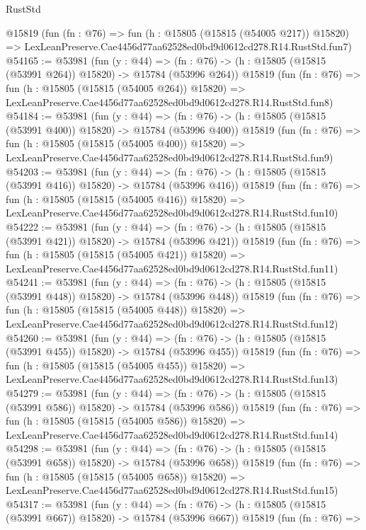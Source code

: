 \begin{lexlean}{RustStd}
\begin{coremodule}
    @15819
    (fun (fn : @76) =>
    fun (h : @15805 (@15815 (@54005 @217)) @15820) =>
    LexLeanPreserve.Cae4456d77aa62528ed0bd9d0612cd278.R14.RustStd.fun7)
@54165 := @53981
    (fun (y : @44) =>
    (fn : @76) -> (h : @15805 (@15815 (@53991 @264)) @15820) -> @15784 (@53996 @264))
    @15819
    (fun (fn : @76) =>
    fun (h : @15805 (@15815 (@54005 @264)) @15820) =>
    LexLeanPreserve.Cae4456d77aa62528ed0bd9d0612cd278.R14.RustStd.fun8)
@54184 := @53981
    (fun (y : @44) =>
    (fn : @76) -> (h : @15805 (@15815 (@53991 @400)) @15820) -> @15784 (@53996 @400))
    @15819
    (fun (fn : @76) =>
    fun (h : @15805 (@15815 (@54005 @400)) @15820) =>
    LexLeanPreserve.Cae4456d77aa62528ed0bd9d0612cd278.R14.RustStd.fun9)
@54203 := @53981
    (fun (y : @44) =>
    (fn : @76) -> (h : @15805 (@15815 (@53991 @416)) @15820) -> @15784 (@53996 @416))
    @15819
    (fun (fn : @76) =>
    fun (h : @15805 (@15815 (@54005 @416)) @15820) =>
    LexLeanPreserve.Cae4456d77aa62528ed0bd9d0612cd278.R14.RustStd.fun10)
@54222 := @53981
    (fun (y : @44) =>
    (fn : @76) -> (h : @15805 (@15815 (@53991 @421)) @15820) -> @15784 (@53996 @421))
    @15819
    (fun (fn : @76) =>
    fun (h : @15805 (@15815 (@54005 @421)) @15820) =>
    LexLeanPreserve.Cae4456d77aa62528ed0bd9d0612cd278.R14.RustStd.fun11)
@54241 := @53981
    (fun (y : @44) =>
    (fn : @76) -> (h : @15805 (@15815 (@53991 @448)) @15820) -> @15784 (@53996 @448))
    @15819
    (fun (fn : @76) =>
    fun (h : @15805 (@15815 (@54005 @448)) @15820) =>
    LexLeanPreserve.Cae4456d77aa62528ed0bd9d0612cd278.R14.RustStd.fun12)
@54260 := @53981
    (fun (y : @44) =>
    (fn : @76) -> (h : @15805 (@15815 (@53991 @455)) @15820) -> @15784 (@53996 @455))
    @15819
    (fun (fn : @76) =>
    fun (h : @15805 (@15815 (@54005 @455)) @15820) =>
    LexLeanPreserve.Cae4456d77aa62528ed0bd9d0612cd278.R14.RustStd.fun13)
@54279 := @53981
    (fun (y : @44) =>
    (fn : @76) -> (h : @15805 (@15815 (@53991 @586)) @15820) -> @15784 (@53996 @586))
    @15819
    (fun (fn : @76) =>
    fun (h : @15805 (@15815 (@54005 @586)) @15820) =>
    LexLeanPreserve.Cae4456d77aa62528ed0bd9d0612cd278.R14.RustStd.fun14)
@54298 := @53981
    (fun (y : @44) =>
    (fn : @76) -> (h : @15805 (@15815 (@53991 @658)) @15820) -> @15784 (@53996 @658))
    @15819
    (fun (fn : @76) =>
    fun (h : @15805 (@15815 (@54005 @658)) @15820) =>
    LexLeanPreserve.Cae4456d77aa62528ed0bd9d0612cd278.R14.RustStd.fun15)
@54317 := @53981
    (fun (y : @44) =>
    (fn : @76) -> (h : @15805 (@15815 (@53991 @667)) @15820) -> @15784 (@53996 @667))
    @15819
    (fun (fn : @76) =>

\end{coremodule}
\end{lexlean}
